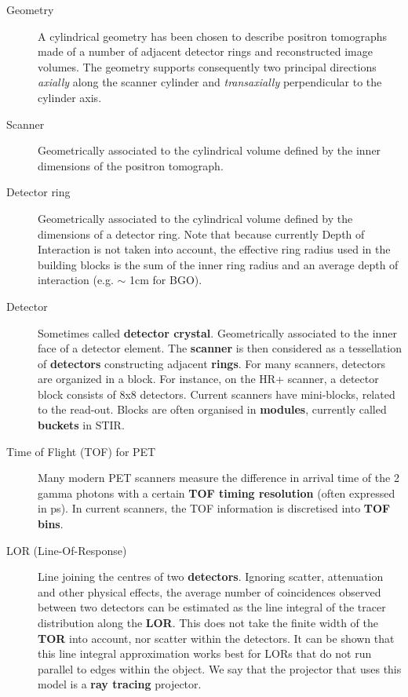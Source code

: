 \documentclass{article}
\begin{document}
\begin{description}

\item[Geometry] 
A cylindrical geometry has been chosen to describe positron 
tomographs made of a number of adjacent detector rings and reconstructed 
image volumes. The geometry supports consequently two principal 
directions \textit{axially} along the scanner cylinder and \textit{transaxially} 
perpendicular to the cylinder axis.

\item[Scanner] 
Geometrically associated to the cylindrical volume defined by 
the inner dimensions of the positron tomograph.

\item[Detector ring ] 
Geometrically associated to the cylindrical volume defined by 
the dimensions of a detector ring. Note that because currently 
Depth of Interaction is not taken into account, the effective ring radius 
used in the building blocks is the sum of the inner ring radius 
and an average depth of interaction (e.g. \ensuremath{\sim} 1cm for BGO).

\item[Detector] 
Sometimes called \textbf{detector crystal}. Geometrically associated 
to the inner face of a detector element. The \textbf{scanner} is then 
considered as a tessellation of \textbf{detectors} constructing adjacent \textbf{rings}. 
For many scanners, detectors are organized in a block. For instance, 
on the HR+ scanner, a detector block consists of 8x8 detectors. Current scanners
have mini-blocks, related to the read-out.
Blocks are often organised in \textbf{modules}, currently called \textbf{buckets} in STIR.

\item[Time of Flight (TOF) for PET]
Many modern PET scanners measure the difference in arrival time of the 2 gamma photons with
a certain \textbf{TOF timing resolution} (often expressed in ps). In current scanners,
the TOF information is discretised into \textbf{TOF bins}.


\item[LOR (Line-Of-Response)] 
Line joining the centres of two \textbf{detectors}. Ignoring scatter, 
attenuation and other physical effects, the average number of 
coincidences observed between two detectors can be estimated 
as the line integral of the tracer distribution along the \textbf{LOR}. 
This does not take the finite width of the \textbf{TOR} into account, 
nor scatter within the detectors. It can be shown that this line 
integral approximation works best for LORs that do not run parallel 
to edges within the object. We say that the projector that uses 
this model is a \textbf{ray tracing} projector.


\end{description}
\end{document}
